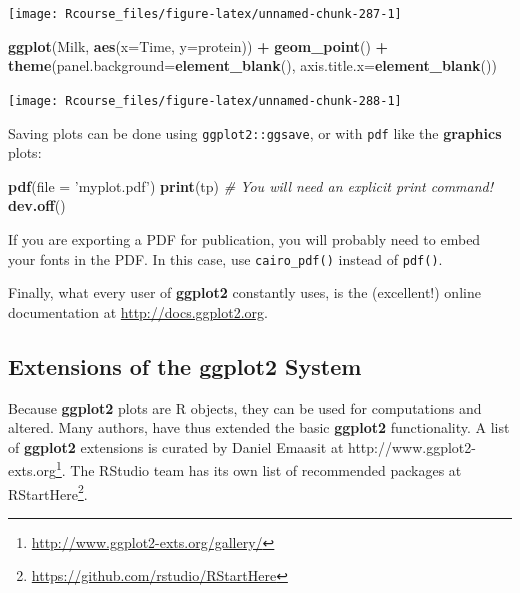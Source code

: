 \documentclass[]{book}
\newenvironment{Shaded}{\begin{snugshade}}{\end{snugshade}}
\newcommand{\CommentTok}[1]{\textcolor[rgb]{0.56,0.35,0.01}{\textit{#1}}}
\newcommand{\DataTypeTok}[1]{\textcolor[rgb]{0.13,0.29,0.53}{#1}}
\newcommand{\KeywordTok}[1]{\textcolor[rgb]{0.13,0.29,0.53}{\textbf{#1}}}
\newcommand{\NormalTok}[1]{#1}
\newcommand{\OperatorTok}[1]{\textcolor[rgb]{0.81,0.36,0.00}{\textbf{#1}}}
\newcommand{\StringTok}[1]{\textcolor[rgb]{0.31,0.60,0.02}{#1}}
\renewcommand{\href}[2]{#2\footnote{\url{#1}}}
\theoremstyle{definition}
\theoremstyle{definition}
\theoremstyle{definition}
\theoremstyle{remark}
\let\BeginKnitrBlock\begin \let\EndKnitrBlock\end
\begin{document}
\texttt{[image: Rcourse\_files/figure-latex/unnamed-chunk-287-1]}

\begin{Shaded}
\begin{Highlighting}[]
\KeywordTok{ggplot}\NormalTok{(Milk, }\KeywordTok{aes}\NormalTok{(}\DataTypeTok{x=}\NormalTok{Time, }\DataTypeTok{y=}\NormalTok{protein)) }\OperatorTok{+}
\StringTok{  }\KeywordTok{geom_point}\NormalTok{() }\OperatorTok{+}
\StringTok{  }\KeywordTok{theme}\NormalTok{(}\DataTypeTok{panel.background=}\KeywordTok{element_blank}\NormalTok{(),}
        \DataTypeTok{axis.title.x=}\KeywordTok{element_blank}\NormalTok{())}
\end{Highlighting}
\end{Shaded}

\texttt{[image: Rcourse\_files/figure-latex/unnamed-chunk-288-1]}

Saving plots can be done using \texttt{ggplot2::ggsave}, or with \texttt{pdf} like the \textbf{graphics} plots:

\begin{Shaded}
\begin{Highlighting}[]
\KeywordTok{pdf}\NormalTok{(}\DataTypeTok{file =} \StringTok{'myplot.pdf'}\NormalTok{)}
\KeywordTok{print}\NormalTok{(tp) }\CommentTok{# You will need an explicit print command!}
\KeywordTok{dev.off}\NormalTok{()}
\end{Highlighting}
\end{Shaded}

\BeginKnitrBlock{remark}
{}If you are exporting a PDF for publication, you will probably need to embed your fonts in the PDF.
In this case, use \texttt{cairo\_pdf()} instead of \texttt{pdf()}.
\EndKnitrBlock{remark}

Finally, what every user of \textbf{ggplot2} constantly uses, is the (excellent!) online documentation at \url{http://docs.ggplot2.org}.

\hypertarget{extensions-of-the-ggplot2-system}{%
\subsection{Extensions of the ggplot2 System}\label{extensions-of-the-ggplot2-system}}

Because \textbf{ggplot2} plots are R objects, they can be used for computations and altered.
Many authors, have thus extended the basic \textbf{ggplot2} functionality.
A list of \textbf{ggplot2} extensions is curated by Daniel Emaasit at \href{http://www.ggplot2-exts.org/gallery/}{http://www.ggplot2-exts.org}.
The RStudio team has its own list of recommended packages at \href{https://github.com/rstudio/RStartHere}{RStartHere}.
\end{document}
